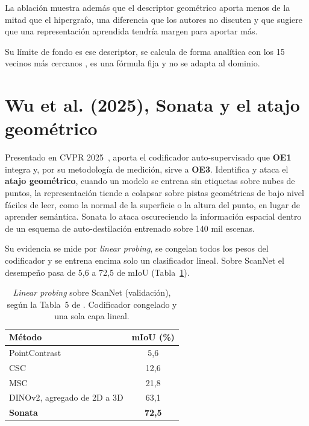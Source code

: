 La ablación muestra además que el descriptor geométrico aporta menos de la mitad
que el hipergrafo, una diferencia que los autores no discuten y que sugiere que
una representación aprendida tendría margen para aportar más.

Su límite de fondo es ese descriptor, se calcula de forma analítica con los 15
vecinos más cercanos \cite{zhang2026hyperncd}, es una fórmula fija y no se adapta
al dominio.

\section[Sonata]{Wu et al. (2025), Sonata y el atajo geométrico}
\label{sec:sonata}

Presentado en CVPR 2025~\cite{wu2025sonata}, aporta el codificador
auto-supervisado que \textbf{OE1} integra y, por su metodología de medición,
sirve a \textbf{OE3}. Identifica y ataca el \textbf{atajo geométrico}, cuando un
modelo se entrena sin etiquetas sobre nubes de puntos, la representación tiende a colapsar
sobre pistas geométricas de bajo nivel fáciles de leer, como la normal de la
superficie o la altura del punto, en lugar de aprender semántica. Sonata lo
ataca oscureciendo la información espacial dentro de un esquema de
auto-destilación entrenado sobre 140 mil escenas.

Su evidencia se mide por \emph{linear probing}, se congelan todos los pesos del
codificador y se entrena encima solo un clasificador lineal. Sobre ScanNet el
desempeño pasa de 5,6 a 72,5 de mIoU (Tabla~\ref{tab:linprobe}).

\begin{table}[!htbp]
\centering
{}\small
\caption[\emph{Linear probing} sobre ScanNet]{\emph{Linear probing} sobre ScanNet (validación), según la
Tabla~5 de \cite{wu2025sonata}. Codificador congelado y una sola capa lineal.}
\label{tab:linprobe}
\begin{tabular}{lc}
\hline
Método & mIoU (\%) \\
\hline
PointContrast & 5,6 \\
CSC & 12,6 \\
MSC & 21,8 \\
DINOv2, agregado de 2D a 3D & 63,1 \\
\textbf{Sonata} & \textbf{72,5} \\
\hline
\end{tabular}
\end{table}

